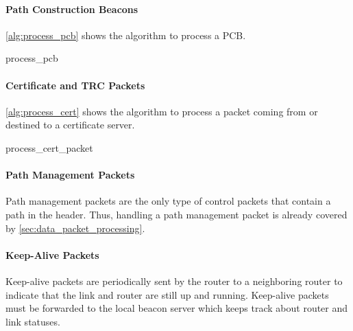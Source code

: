 \paragraph{Path Construction Beacons}
\autoref{alg:process_pcb} shows the algorithm to process a PCB.
\begin{algorithm}
\caption{process\_pcb}
\label{alg:process_pcb}
\begin{algorithmic}
\Else
\EndIf
\EndProcedure
\end{algorithmic} 
\end{algorithm}

\paragraph{Certificate and TRC Packets}
\autoref{alg:process_cert} shows the algorithm to process a packet coming from 
or destined to a certificate server.
\begin{algorithm}
\caption{process\_cert\_packet}
\label{alg:process_cert}
\begin{algorithmic}
\Else
\EndIf
\EndProcedure
\end{algorithmic} 
\end{algorithm}

\paragraph{Path Management Packets}
Path management packets are the only type of control packets that contain a 
path in the header. Thus, handling a path management packet is already covered 
by \autoref{sec:data_packet_processing}.

\paragraph{Keep-Alive Packets}
Keep-alive packets are periodically sent by the router to a neighboring router 
to indicate that the link and router are still up and running. Keep-alive 
packets must be forwarded to the local beacon server which keeps track about 
router and link statuses.

